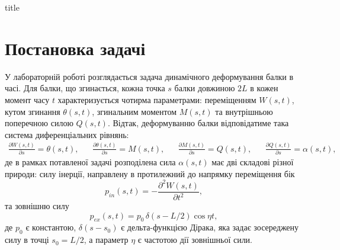 \documentclass{mathreport}
\begin{document}




{title}

\tableofcontents

\newpage

\section{Постановка задачі}

У лабораторній роботі розглядається задача динамічного деформування балки в часі. Для балки, що згинається, кожна точка $s$ балки довжиною $2L$ в кожен момент часу $t$ характеризується чотирма параметрами: переміщенням $W(s,t)$, кутом згинання $\theta(s,t)$, згинальним моментом $M(s,t)$ та внутрішньою поперечною силою $Q(s,t)$. Відтак, деформуванню балки відповідатиме така система диференціальних рівнянь:
\begin{align}\label{eq: initial d.e.}
    \frac{\partial W(s,t)}{\partial s} = \theta(s,t), &&  \frac{\partial\theta(s,t)}{\partial s} = M(s,t), && \frac{\partial M(s,t)}{\partial s} = Q(s,t), && \frac{\partial Q(s,t)}{\partial s} = \alpha(s,t),
\end{align}
де в рамках потавленої задачі розподілена сила $\alpha(s,t)$ має дві складові різної природи: силу інерції, направлену в протилежний до напрямку переміщення бік
\begin{equation}\label{eq: inertia force}
    p_{in}(s,t) = -\frac{\partial^2 W(s,t)}{\partial t^2},
\end{equation}
та зовнішню силу
\begin{equation}\label{eq: external force}
    p_{ex}(s,t) = p_0\, \delta(s-L/2) \cos{\eta t},
\end{equation}
де $p_0$ є константою, $\delta(s-s_0)$ є дельта-функцією Дірака, яка задає зосереджену силу в точці $s_0=L/2$, а параметр $\eta$ є частотою дії зовнішньої сили. 
\end{document}
